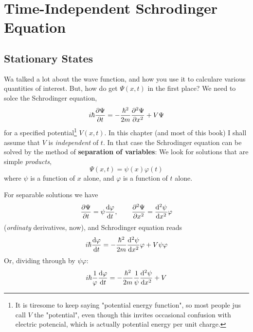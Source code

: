 \chapter{Time-Independent Schrodinger Equation}
\section{Stationary States}
Wa talked a lot about the wave function, and how you use it to calculare various quantities of interest. But, how do get $\Psi(x,t)$ in the first place? We need to solce the Schrodinger equation,
\begin{equation}\label{2.1}
	i\hbar\pdv{\Psi}{t}=-\frac{\hbar^2}{2m}\pdv[2]{\Psi}{x}+V\Psi
\end{equation}
for a specified potential\footnote{It is tiresome to keep saying "potential energy function", so most people jus call $V$ the "potential", even though this invites occasional confusion with electric potencial, which is actually potential energy per unit charge.} $V(x,t)$. In this chapter (and most of this book) I shall assume that $V$ is \textit{independent} of $t$. In that case the Schrodinger equation can be solved by the method of \textbf{separation of variables}: We look for solutions that are simple \textit{products},
\begin{equation}\label{2.2}
	\Psi(x,t)=\psi(x)\varphi(t)
\end{equation}
where $\psi$ is a function of $x$ alone, and $\varphi$ is a function of $t$ alone. 

For separable solutions we have
\begin{equation*}
	\pdv{\Psi}{t}=\psi\dv{\varphi}{t},\qquad \pdv[2]{\Psi}{x}=\dv[2]{\psi}{x}\varphi
\end{equation*}
(\textit{ordinaty} derivatives, now), and Schrodinger equation reads
\begin{equation}
	i\hbar\dv{\varphi}{t}=-\frac{\hbar^2}{2m}\dv[2]{\psi}{x}\varphi + V\psi\varphi
\end{equation}
Or, dividing through by $\psi\varphi$:
\begin{equation}\label{2.3}
	i\hbar\frac{1}{\varphi}\dv{\varphi}{t}=-\frac{\hbar^2}{2m}\frac{1}{\psi}\dv[2]{\psi}{x}+V
\end{equation}

